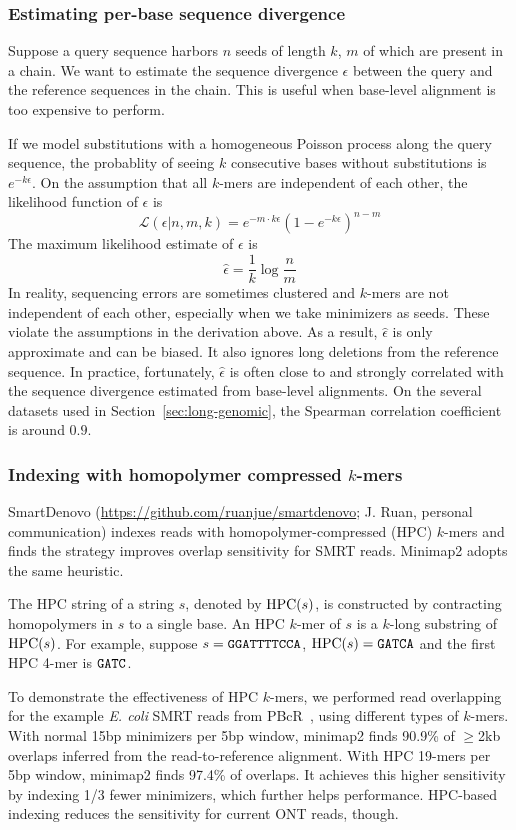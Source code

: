 \documentclass{bioinfo}
\begin{document}
\begin{methods}
\subsubsection{Estimating per-base sequence divergence}
Suppose a query sequence harbors $n$ seeds of length $k$, $m$ of which are
present in a chain. We want to estimate the sequence divergence $\epsilon$
between the query and the reference sequences in the chain. This is useful
when base-level alignment is too expensive to perform.

If we model substitutions with a homogeneous Poisson process along the query
sequence, the probablity of seeing $k$ consecutive bases without substitutions
is $e^{-k\epsilon}$. On the assumption that all $k$-mers are independent of
each other, the likelihood function of $\epsilon$ is
\[
\mathcal{L}(\epsilon|n,m,k)=e^{-m\cdot k\epsilon}(1-e^{-k\epsilon})^{n-m}
\]
The maximum likelihood estimate of $\epsilon$ is
\[
\hat{\epsilon}=\frac{1}{k}\log\frac{n}{m}
\]
In reality, sequencing errors are sometimes clustered and $k$-mers are not
independent of each other, especially when we take minimizers as seeds. These
violate the assumptions in the derivation above. As a result, $\hat{\epsilon}$
is only approximate and can be biased. It also ignores long deletions from the
reference sequence. In practice, fortunately, $\hat{\epsilon}$ is often close
to and strongly correlated with the sequence divergence estimated from
base-level alignments. On the several datasets used in
Section~\ref{sec:long-genomic}, the Spearman correlation coefficient is around
$0.9$.

\subsubsection{Indexing with homopolymer compressed $k$-mers}
SmartDenovo
(\href{https://github.com/ruanjue/smartdenovo}{https://github.com/ruanjue/smartdenovo};
J. Ruan, personal communication) indexes reads with homopolymer-compressed (HPC)
$k$-mers and finds the strategy improves overlap sensitivity for SMRT reads.
Minimap2 adopts the same heuristic.

The HPC string of a string $s$, denoted by ${\rm HPC}(s)$, is constructed by
contracting homopolymers in $s$ to a single base.  An HPC $k$-mer of $s$ is a
$k$-long substring of ${\rm HPC}(s)$. For example, suppose $s={\tt GGATTTTCCA}$,
${\rm HPC}(s)={\tt GATCA}$ and the first HPC 4-mer is ${\tt GATC}$.

To demonstrate the effectiveness of HPC $k$-mers, we performed read overlapping
for the example {\it E. coli} SMRT reads from PBcR~\citep{Berlin:2015xy}, using
different types of $k$-mers. With normal 15bp minimizers per 5bp window,
minimap2 finds 90.9\% of $\ge$2kb overlaps inferred from the read-to-reference
alignment. With HPC 19-mers per 5bp window, minimap2 finds 97.4\% of overlaps. It achieves this
higher sensitivity by indexing 1/3 fewer minimizers, which further helps
performance. HPC-based indexing reduces the sensitivity for current ONT reads, though.


\end{methods}
\end{document}
